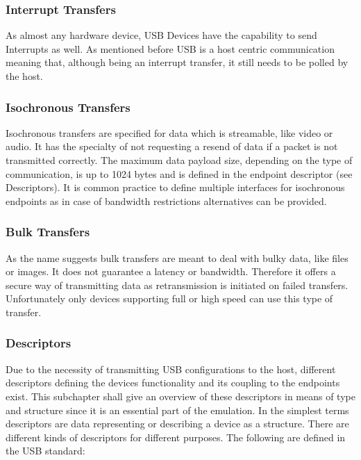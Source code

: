 \subsubsection*{Interrupt Transfers}
As almost any hardware device, USB Devices have the capability to send Interrupts as well. As mentioned before USB is a host centric communication 
meaning that, although being an interrupt transfer, it still needs to be polled by the host. 
\subsubsection*{Isochronous Transfers}
Isochronous transfers are specified for data which is streamable, like video or audio. It has the specialty of not requesting a resend of data if a packet is not transmitted correctly. The maximum data payload size, depending on the type of communication, is up to 1024 bytes and is defined in the endpoint descriptor (see Descriptors). It is common practice to define multiple interfaces for isochronous endpoints as in case of bandwidth restrictions alternatives can be provided.
\subsubsection*{Bulk Transfers}
As the name suggests bulk transfers are meant to deal with bulky data, like files or images. It does not guarantee a latency or bandwidth.
Therefore it offers a secure way of transmitting data as retransmission is initiated on failed transfers. Unfortunately only devices supporting 
full or high speed can use this type of transfer. 
\subsubsection*{Descriptors}
Due to the necessity of transmitting USB configurations to the host, different descriptors defining the devices functionality and its coupling to
the endpoints exist. This subchapter shall give an overview of these descriptors in means of type and structure since it is an essential part of the 
emulation. 
In the simplest terms descriptors are data representing or describing a device as a structure. There are different kinds of descriptors for different 
purposes. The following are defined in the USB standard:

